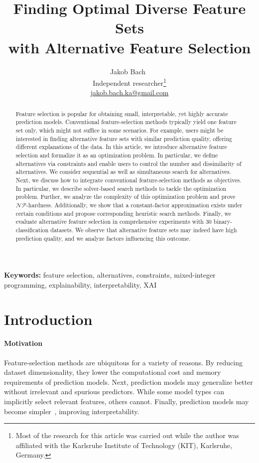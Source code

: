 \documentclass{article}
\title{
	Finding Optimal Diverse Feature Sets\texorpdfstring{\\}{ }with Alternative Feature Selection
}
\author{
	Jakob Bach~\orcidlink{0000-0003-0301-2798}\\
	\small Independent researcher\footnote{Most of the research for this article was carried out while the author was affiliated with the Karlsruhe Institute of Technology (KIT), Karlsruhe, Germany.}\\
	\small \href{mailto:jakob.bach.ka@gmail.com}{jakob.bach.ka@gmail.com}
}
\date{} %
\theoremstyle{definition}
\begin{document}
\maketitle

\begin{abstract}
Feature selection is popular for obtaining small, interpretable, yet highly accurate prediction models.
Conventional feature-selection methods typically yield one feature set only, which might not suffice in some scenarios.
For example, users might be interested in finding alternative feature sets with similar prediction quality, offering different explanations of the data.
In this article, we introduce alternative feature selection and formalize it as an optimization problem.
In particular, we define alternatives via constraints and enable users to control the number and dissimilarity of alternatives.
We consider sequential as well as simultaneous search for alternatives.
Next, we discuss how to integrate conventional feature-selection methods as objectives.
In particular, we describe solver-based search methods to tackle the optimization problem.
Further, we analyze the complexity of this optimization problem and prove $\mathcal{NP}$-hardness.
Additionally, we show that a constant-factor approximation exists under certain conditions and propose corresponding heuristic search methods.
Finally, we evaluate alternative feature selection in comprehensive experiments with 30 binary-classification datasets.
We observe that alternative feature sets may indeed have high prediction quality, and we analyze factors influencing this outcome.
\end{abstract}
%
\textbf{Keywords:} feature selection, alternatives, constraints, mixed-integer programming, explainability, interpretability, XAI

\section{Introduction}
\label{sec:afs:introduction}

\paragraph{Motivation}

Feature-selection methods are ubiquitous for a variety of reasons.
By reducing dataset dimensionality, they lower the computational cost and memory requirements of prediction models.
Next, prediction models may generalize better without irrelevant and spurious predictors.
While some model types can implicitly select relevant features, others cannot.
Finally, prediction models may become simpler~\cite{li2017feature}, improving interpretability.
\end{document}
